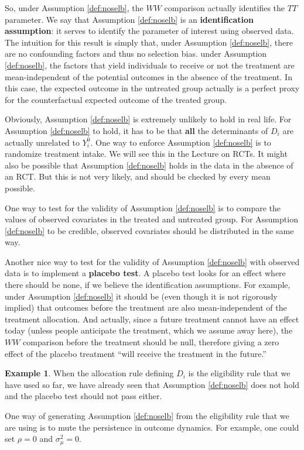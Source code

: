 \documentclass[
]{book}
\theoremstyle{definition}
\theoremstyle{definition}
\newtheorem{example}{Example}[chapter]
\theoremstyle{definition}
\theoremstyle{definition}
\theoremstyle{remark}
\begin{document}
So, under Assumption \ref{def:noselb}, the \(WW\) comparison actually identifies the \(TT\) parameter.
We say that Assumption \ref{def:noselb} is an \textbf{identification assumption}: it serves to identify the parameter of interest using observed data.
The intuition for this result is simply that, under Assumption \ref{def:noselb}, there are no confounding factors and thus no selection bias.
under Assumption \ref{def:noselb}, the factors that yield individuals to receive or not the treatment are mean-independent of the potential outcomes in the absence of the treatment.
In this case, the expected outcome in the untreated group actually is a perfect proxy for the counterfactual expected outcome of the treated group.

Obviously, Assumption \ref{def:noselb} is extremely unlikely to hold in real life.
For Assumption \ref{def:noselb} to hold, it has to be that \textbf{all} the determinants of \(D_i\) are actually unrelated to \(Y_i^0\).
One way to enforce Assumption \ref{def:noselb} is to randomize treatment intake.
We will see this in the Lecture on RCTs.
It might also be possible that Assumption \ref{def:noselb} holds in the data in the absence of an RCT.
But this is not very likely, and should be checked by every mean possible.

One way to test for the validity of Assumption \ref{def:noselb} is to compare the values of observed covariates in the treated and untreated group.
For Assumption \ref{def:noselb} to be credible, observed covariates should be distributed in the same way.

Another nice way to test for the validity of Assumption \ref{def:noselb} with observed data is to implement a \textbf{placebo test}.
A placebo test looks for an effect where there should be none, if we believe the identification assumptions.
For example, under Assumption \ref{def:noselb} it should be (even though it is not rigorously implied) that outcomes before the treatment are also mean-independent of the treatment allocation.
And actually, since a future treatment cannot have an effect today (unless people anticipate the treatment, which we assume away here), the \(WW\) comparison before the treatment should be null, therefore giving a zero effect of the placebo treatment ``will receive the treatment in the future.''

\begin{example}
\protect\hypertarget{exm:unnamed-chunk-21}{}{\label{exm:unnamed-chunk-21} }When the allocation rule defining \(D_i\) is the eligibility rule that we have used so far, we have already seen that Assumption \ref{def:noselb} does not hold and the placebo test should not pass either.
\end{example}
One way of generating Assumption \ref{def:noselb} from the eligibility rule that we are using is to mute the persistence in outcome dynamics.
For example, one could set \(\rho=0\) and \(\sigma^2_{\mu}=0\).
\end{document}
